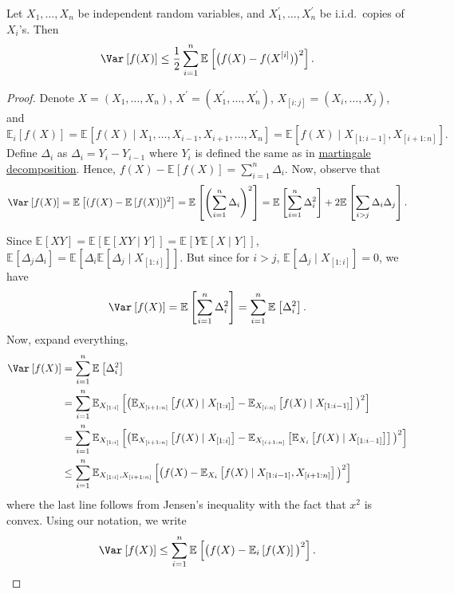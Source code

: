 \begin{theorem}\label{pf-thm:Efron-Stein-inequality}
	Let \(X_1, \dots , X_n\) be independent random variables, and \(X_1^{\prime} , \dots , X_n^{\prime} \) be i.i.d.\ copies of \(X_i\)'s. Then
	\[
		\Var_{}\left[f(X) \right] \leq \frac{1}{2} \sum_{i=1}^{n} \mathbb{E}_{}\left[\big(f(X) - f(X^{[i]}) \big)^2 \right].
	\]
\end{theorem}
\begin{proof}
	Denote \(X = (X_1, \dots , X_n)\), \(X^{\prime} = (X_1^{\prime} , \dots , X_n^{\prime} )\), \(X_{[i:j]} = (X_i, \dots , X_j)\), and
	\[
		\mathbb{E}_{i}\left[f(X) \right]
		= \mathbb{E}_{}\left[f(X) \mid X_1, \dots , X_{i-1}, X_{i+1}, \dots , X_n \right]
		= \mathbb{E}_{}\left[f(X) \mid X_{[1:i-1]}, X_{[i+1:n]} \right] .
	\]
	Define \(\Delta _i\) as \(\Delta _i = Y_i - Y_{i-1} \) where \(Y_i\) is defined the same as in \hyperref[def:martingale-decomposition]{martingale decomposition}. Hence, \(f(X) - \mathbb{E}_{}\left[f(X) \right] = \sum_{i=1}^{n} \Delta _i\). Now, observe that
	\[
		\Var_{}\left[f(X) \right]
		= \mathbb{E}_{}\left[(f(X) - \mathbb{E}_{}\left[f(X) \right] )^2 \right]
		= \mathbb{E}_{}\left[\left( \sum_{i=1}^{n} \Delta _i \right) ^2 \right]
		= \mathbb{E}_{}\left[\sum_{i=1}^{n} \Delta _i ^2 \right] + 2 \mathbb{E}_{}\left[\sum_{i > j} \Delta _i \Delta _j \right] .
	\]

	Since \(\mathbb{E}_{}\left[XY \right] = \mathbb{E}_{}\left[\mathbb{E}_{}\left[XY \mid Y \right] \right] = \mathbb{E}_{}\left[Y \mathbb{E}_{}\left[X \mid Y \right] \right] \), \(\mathbb{E}_{}\left[\Delta _j \Delta _i \right] = \mathbb{E}_{}\left[\Delta _i \mathbb{E}_{}\left[\Delta _j \mid X_{[1:i]} \right] \right] \). But since for \(i > j\), \(\mathbb{E}_{}\left[\Delta _j \mid X_{[1:i]} \right] = 0\), we have
	\[
		\Var_{}\left[f(X) \right] = \mathbb{E}_{}\left[\sum_{i=1}^{n} \Delta _i^2 \right] = \sum_{i=1}^{n} \mathbb{E}_{}\left[\Delta _i^2 \right] .
	\]
	Now, expand everything,
	\[
		\begin{split}
			\Var_{}\left[f(X) \right]
			&= \sum_{i=1}^{n} \mathbb{E}_{}\left[\Delta _i^2 \right] \\
			&= \sum_{i=1}^{n} \mathbb{E}_{X_{[1:i]}}\left[\big( \mathbb{E}_{X_{[i+1:n]}}\left[f(X) \mid X_{[1:i]} \right] - \mathbb{E}_{X_{[i:n]}}\left[f(X) \mid X_{[1:i-1]} \right] \big)^2 \right] \\
			&= \sum_{i=1}^{n} \mathbb{E}_{X_{[1:i]}}\left[ \big( \mathbb{E}_{X_{[i+1:n]}}\left[f(X) \mid X_{[1:i]} \right] - \mathbb{E}_{X_{[i+1:n]}}\left[ \mathbb{E}_{X_i}\left[f(X) \mid X_{[1:i-1]} \right] \right] \big)^2 \right]\\
			&\leq \sum_{i=1}^{n} \mathbb{E}_{X_{[1:i]}, X_{[i+1:n]}}\left[\big( f(X) - \mathbb{E}_{X_i}\left[f(X) \mid X_{[1:i-1]}, X_{[i+1:n]} \right] \big)^2 \right]
		\end{split}
	\]
	where the last line follows from Jensen's inequality with the fact that \(x^2\) is convex. Using our notation, we write
	\[
		\Var_{}\left[f(X) \right] \leq \sum_{i=1}^{n} \mathbb{E}_{}\left[\big(f(X) - \mathbb{E}_{i}\left[f(X) \right] \big)^2\right] .
	\]


\end{proof}
